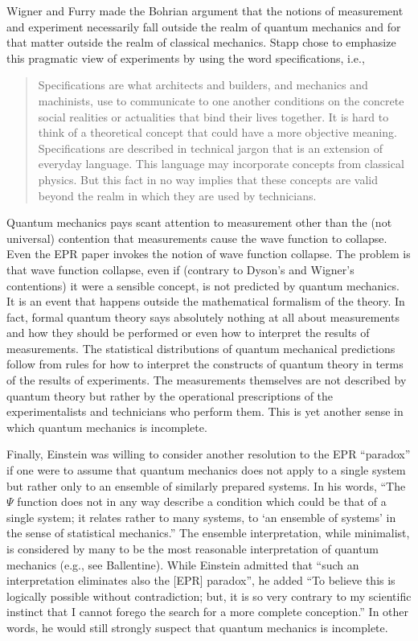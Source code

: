 \documentclass[12pt]{article}
\begin{document}
Wigner\cite{Wig62} and Furry\cite{Fur62} made the Bohrian argument that the notions of measurement and experiment necessarily fall outside the realm of quantum mechanics and for that matter outside the realm of classical mechanics.  Stapp chose to emphasize this pragmatic view of experiments by using the word specifications, i.e.,\cite{Sta72}
\begin{quotation}
Specifications are what architects and builders, and mechanics and machinists, use to communicate to one another conditions on the concrete social realities or actualities that bind their lives together. It is hard to think of a theoretical concept that could have a more objective meaning. Specifications are described in technical jargon that is an extension of everyday language. This language may incorporate concepts from classical physics. But this fact in no way implies that these concepts are valid beyond the realm in which they are used by technicians.
\end{quotation}
Quantum mechanics pays scant attention to measurement other than the (not universal) contention that measurements cause the wave function to collapse.  Even the EPR paper invokes the notion of wave function collapse.  The problem is that wave function collapse, even if (contrary to Dyson's and Wigner's contentions) it were a sensible concept, is not predicted by quantum mechanics. It is an event that happens outside the mathematical formalism of the theory. In fact, formal quantum theory says absolutely nothing at all about measurements and how they should be performed or even how to interpret the results of measurements. The statistical distributions of quantum mechanical predictions follow from rules for how to interpret the constructs of quantum theory in terms of the results of experiments. The measurements themselves are not described by quantum theory but rather by the operational prescriptions of the experimentalists and technicians who perform them. This is yet another sense in which quantum mechanics is incomplete.

Finally, Einstein was willing to consider another resolution to the EPR ``paradox'' if one were to assume that quantum mechanics does not apply to a single system but rather only to an ensemble of similarly prepared systems.  In his words, ``The $\Psi$ function does not in any way describe a condition which could be that of a single system; it relates rather to many systems, to `an ensemble of systems' in the sense of statistical mechanics.''\cite{Ein36}  The ensemble interpretation, while minimalist, is considered by many to be the most reasonable interpretation of quantum mechanics (e.g., see Ballentine\cite{Bal70}).  While Einstein admitted that ``such an interpretation eliminates also the [EPR] paradox'', he added ``To believe this is logically possible without contradiction; but, it is so very contrary to my scientific instinct that I cannot forego the search for a more complete conception.'' In other words, he would still strongly suspect that quantum mechanics is incomplete.
\end{document}
